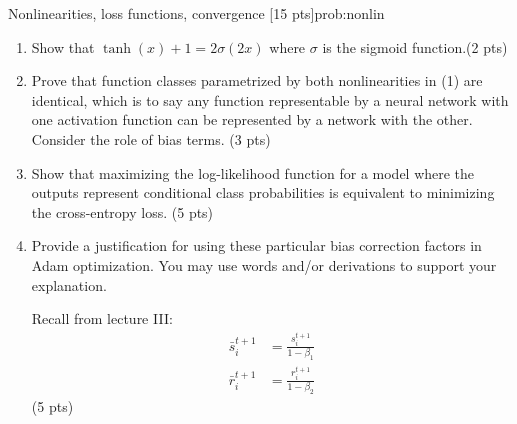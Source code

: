 \newpage{}
\begin{problem}{Nonlinearities, loss functions, convergence \hfill [15 pts]}{prob:nonlin}

\begin{enumerate}
\item Show that $\tanh(x) + 1 = 2 \sigma (2x)$ where $\sigma$ is the sigmoid
    function.\hfill (2 pts)
\item Prove that function classes parametrized by both nonlinearities in (1) are
    identical, which is to say any function representable by a neural network
    with one activation function can be represented by a network with the other.
    Consider the role of bias terms. \hfill (3 pts)
\item Show that maximizing the log-likelihood function for a model where the
    outputs represent conditional class probabilities is equivalent to
    minimizing the cross-entropy loss. \hfill (5 pts)

\item Provide a justification for using these particular bias correction factors
    in Adam optimization. You may use words and/or derivations to support your
    explanation.

Recall from lecture III:
\begin{align*}
    \bar{s}_i^{t+1} & = \frac{s_i^{t+1}}{1-\beta_1}\\
    \bar{r}_i^{t+1} & = \frac{r_i^{t+1}}{1-\beta_2}
\end{align*} \hfill (5 pts)
    

\end{enumerate}
\end{problem}

